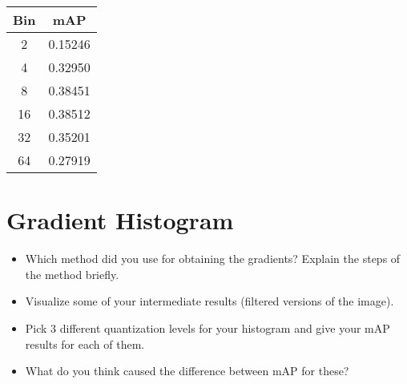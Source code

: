 \documentclass[12pt]{article}
\begin{document}
\begin{minipage}{\textwidth}
	\begin{minipage}{0.49\textwidth}
		\centering
		\captionsetup{width=.9\textwidth}
	 \end{minipage}
	 \hfill
	\begin{minipage}{0.49\textwidth}
		\centering
		\begin{tabular}{ | c | c | }
		  \hline			
		  \bf Bin & \bf mAP \\
		  \hline		
		  2 & 0.15246 \\
		  \hline	
		  4 & 0.32950 \\
		  \hline	
		  8 & 0.38451 \\
		  \hline	
		  16 & 0.38512 \\
		  \hline	
		  32 & 0.35201 \\
		  \hline	
		  64 & 0.27919 \\
		  \hline
		\end{tabular}
		\captionsetup{width=.8\textwidth}
	\end{minipage}
\end{minipage}

\section{Gradient Histogram}

\begin{itemize}
\item Which method did you use for obtaining the gradients? Explain the steps of the method briefly.
\item Visualize some of your intermediate results (filtered versions of the image).
\item Pick 3 different quantization levels for your histogram and give your mAP results for each of them.
\item What do you think caused the difference between mAP for these?
\end{itemize}
\end{document}
